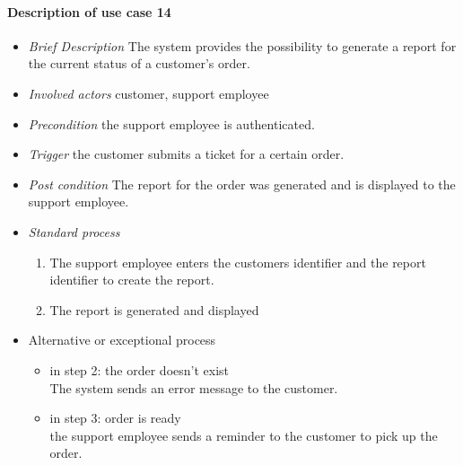 \paragraph{Description of use case 14}
\label{decription_uc14}
\begin{itemize}
\item \textit{Brief Description} The system provides the possibility to generate a report for the current status of a customer's order.
\item \textit{Involved actors} customer, support employee
\item \textit{Precondition} the support employee is authenticated.
\item \textit{Trigger} the customer submits a ticket for a certain order.
\item \textit{Post condition} The report for the order was generated and is displayed to the support employee.
\item \textit{Standard process}
\begin{enumerate}
\item The support employee enters the customers identifier and the report identifier to create the report.
\item The report is generated and displayed
\end{enumerate}
\item Alternative or exceptional process
\begin{itemize}
\item in step 2: the order doesn't exist\\
The system sends an error message to the customer.
\item in step 3: order is ready\\
the support employee sends a reminder to the customer to pick up the order.
\end{itemize}
\end{itemize}


